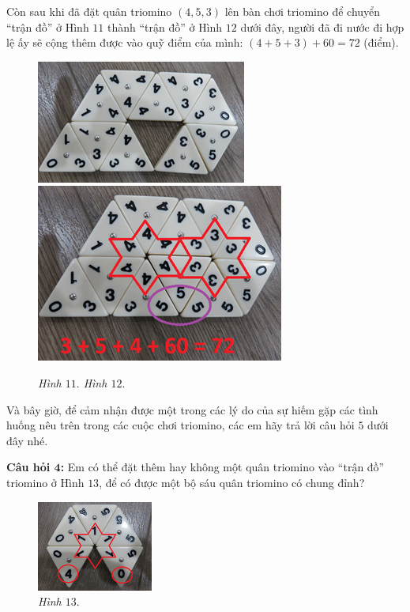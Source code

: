 	Còn sau khi đã đặt quân triomino $(4, 5, 3)$ lên bàn chơi triomino để chuyển “trận đồ” ở Hình $11$ thành “trận đồ” ở Hình $12$ dưới đây, người đã đi nước đi hợp lệ ấy sẽ cộng thêm được vào quỹ điểm của mình:
	\vskip 0.1cm
	\hspace*{40pt} $(4+5+3)+60=72$ (điểm).
	\vskip 0.1cm
	\begin{figure}[H]
		\centering
		\vspace*{-5pt}
		\captionsetup{labelformat=empty, justification=centering}
		\includegraphics[height=0.25\textwidth]{h11a}\quad
		\includegraphics[height=0.25\textwidth]{h12a}
		\caption{\textit{\small Hình $11.$ \hspace*{75pt} Hình $12.$}}
		\vspace*{-5pt}
	\end{figure}
	Và bây giờ, để cảm nhận được một trong các lý do của sự hiếm gặp các tình huống nêu trên trong các cuộc chơi triomino, các em hãy trả lời câu hỏi $5$ dưới đây nhé.
	\vskip 0.1cm
	\begin{multicols}{2}
		\textbf{Câu hỏi $\pmb{4}$:}
		\vskip 0.1cm
		Em có thể đặt thêm hay không một quân  triomino vào “trận đồ” triomino ở Hình $13$, để có được một bộ sáu quân triomino có chung đỉnh?		\begin{figure}[H]
			\centering
			\captionsetup{labelformat=empty, justification=centering}
			\includegraphics[width=0.34\textwidth]{h13a}
			\caption{\textit{\small Hình $13.$}}
			\vspace*{-5pt}
		\end{figure}
	\end{multicols}
